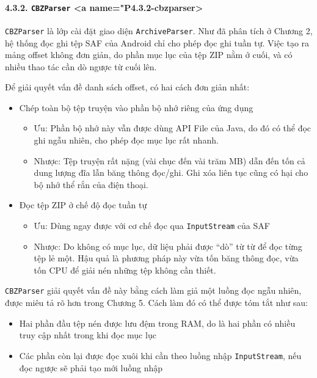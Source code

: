 \documentclass[
]{article}
\providecommand{\tightlist}{%
  \setlength{\itemsep}{0pt}\setlength{\parskip}{0pt}}
\begin{document}
\hypertarget{cbzparser-a-namep4.3.2-cbzparser}{%
\paragraph{\texorpdfstring{4.3.2. \texttt{CBZParser} \textless a
name="P4.3.2-cbzparser\textgreater{}}{4.3.2. CBZParser \textless a name="P4.3.2-cbzparser\textgreater{}}}\label{cbzparser-a-namep4.3.2-cbzparser}}

\texttt{CBZParser} là lớp cài đặt giao diện \texttt{ArchiveParser}. Như
đã phân tích ở Chương 2, hệ thống đọc ghi tệp SAF của Android chỉ cho
phép đọc ghi tuần tự. Việc tạo ra mảng offset không đơn giản, do phần
mục lục của tệp ZIP nằm ở cuối, và có nhiều thao tác cần dò ngược từ
cuối lên.

Để giải quyết vấn đề danh sách offset, có hai cách đơn giản nhất:

\begin{itemize}
\item
  Chép toàn bộ tệp truyện vào phần bộ nhớ riêng của ứng dụng

  \begin{itemize}
  \item
    Ưu: Phần bộ nhớ này vẫn được dùng API File của Java, do đó có thể
    đọc ghi ngẫu nhiên, cho phép đọc mục lục rất nhanh.
  \item
    Nhược: Tệp truyện rất nặng (vài chục đến vài trăm MB) dẫn đến tốn cả
    dung lượng đĩa lẫn băng thông đọc/ghi. Ghi xóa liên tục cũng có hại
    cho bộ nhớ thể rắn của điện thoại.
  \end{itemize}
\item
  Đọc tệp ZIP ở chế độ đọc tuần tự

  \begin{itemize}
  \tightlist
  \item
    Ưu: Dùng ngay được với cơ chế đọc qua \texttt{InputStream} của SAF
  \item
    Nhược: Do không có mục lục, dữ liệu phải được ``dò'' từ từ để đọc
    từng tệp lẻ một. Hậu quả là phương pháp này vừa tốn băng thông đọc,
    vừa tốn CPU để giải nén những tệp không cần thiết.
  \end{itemize}
\end{itemize}

\texttt{CBZParser} giải quyết vấn đề này bằng cách làm giả một luồng đọc
ngẫu nhiên, được miêu tả rõ hơn trong Chương 5. Cách làm đó có thể được
tóm tắt như sau:

\begin{itemize}
\tightlist
\item
  Hai phần đầu tệp nén được lưu đệm trong RAM, do là hai phần có nhiều
  truy cập nhất trong khi đọc mục lục
\item
  Các phần còn lại được đọc xuôi khi cần theo luồng nhập
  \texttt{InputStream}, nếu đọc ngược sẽ phải tạo mới luồng nhập
\end{itemize}
\end{document}
